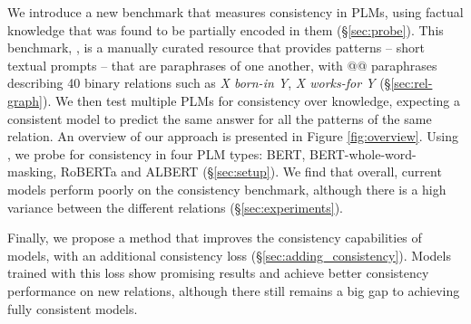 We introduce a new benchmark that measures consistency in PLMs, using factual knowledge that was found to be partially encoded in them (\S \ref{sec:probe}).
This benchmark, \resource{}, is a manually curated resource
that provides patterns -- short textual prompts -- that are paraphrases of one another, with @@ paraphrases describing 40 binary relations such as \textit{X born-in Y}, \textit{X works-for Y} (\S \ref{sec:rel-graph}).
We then test multiple PLMs for consistency over knowledge, 
expecting a consistent model to predict the same answer for all the patterns of the same relation.
An overview of our approach is presented in Figure \ref{fig:overview}.
Using \resource{}, we probe for consistency in four PLM types: BERT, BERT-whole-word-masking, RoBERTa and ALBERT (\S \ref{sec:setup}).
We find that overall, current models perform poorly on the consistency benchmark, although there is a high variance between the different relations (\S \ref{sec:experiments}). 

Finally, we propose a method that improves the consistency capabilities of models, with an additional consistency loss (\S \ref{sec:adding_consistency}). Models trained with this loss show promising results and achieve better consistency performance on new relations, although there still remains a big gap to achieving fully consistent models.






